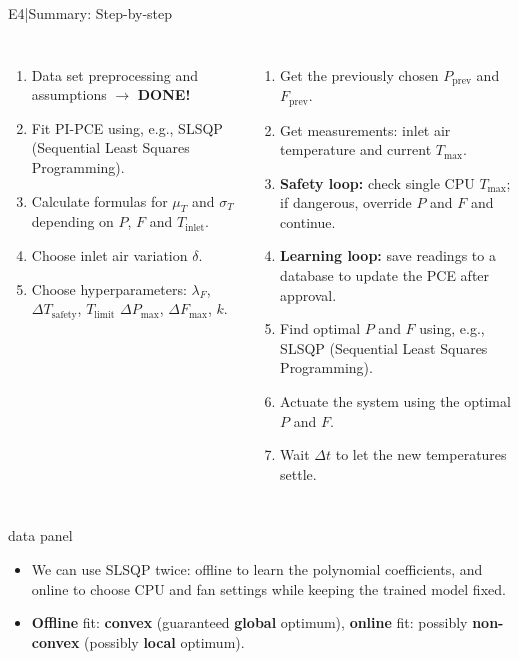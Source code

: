 \renewcommand{\backupcode}{E4}

\begin{frame}[more-space,label=backup-E4]{E4\enspace|\enspace Summary: Step-by-step}
  \begin{columns}[T,onlytextwidth]
      \footnotesize
      \begin{enumerate}
        \setlength{\itemsep}{2pt}
        \item Data set preprocessing and assumptions
          $\rightarrow$ {\color{selectiongreen}\textbf{DONE!}}
        \item Fit PI-PCE using, e.g., SLSQP (Sequential Least Squares Programming).
        \item Calculate formulas for $\mu_T$ and $\sigma_T$ depending on
          $P$, $F$ and $T_{\mathrm{inlet}}$.
        \item Choose inlet air variation $\delta$.
        \item Choose hyperparameters: $\lambda_F$, $\Delta T_{\mathrm{safety}}$, $T_{\mathrm{limit}}$
          $\Delta P_{\max}$, $\Delta F_{\max}$, $k$.
      \end{enumerate}
      \footnotesize
      \begin{enumerate}
        \setlength{\itemsep}{1pt}
        \item Get the previously chosen $P_{\mathrm{prev}}$ and $F_{\mathrm{prev}}$.
        \item Get measurements: inlet air temperature and current $T_{\max}$.
        \item \textbf{Safety loop:} check single CPU $T_{\max}$; if dangerous, override
          $P$ and $F$ and continue.
        \item \textbf{Learning loop:} save readings to a database to update
          the PCE after approval.
        \item Find optimal $P$ and $F$ using, e.g., SLSQP
          (Sequential Least Squares Programming).
        \item Actuate the system using the optimal $P$ and $F$.
        \item Wait $\Delta t$ to let the new temperatures settle.
      \end{enumerate}
  \end{columns}
  \par\vfill
  \begin{beamercolorbox}[sep=2mm,wd=\textwidth]{data panel}
    \footnotesize
    \begin{itemize}
      \setlength{\itemsep}{1pt}
      \item We can use SLSQP twice: offline to learn the polynomial coefficients,
    and online to choose CPU and fan settings while keeping the trained model fixed.
      \item \textbf{Offline} fit: \textbf{convex} (guaranteed \textbf{global} optimum), \textbf{online} fit: possibly \textbf{non-convex} (possibly \textbf{local} optimum).
    \end{itemize}
  \end{beamercolorbox}
\end{frame}

